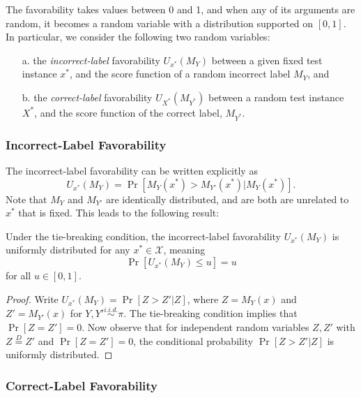 \documentclass[twoside,11pt]{article}
\begin{document}
The favorability takes values between 0 and 1, and when any of its
arguments are random, it becomes a random variable with a distribution
supported on $[0,1]$.  In particular, we consider the following two
random variables:
\begin{itemize}
\item[a.] the \emph{incorrect-label} favorability $U_{x^*}(M_Y)$
  between a given fixed test instance $x^*$, and the score function of
  a random incorrect label $M_{Y}$, and
\item[b.] the \emph{correct-label} favorability $U_{X^*}(M_{Y^*})$
  between a random test instance $X^*$, and the score function of the
  correct label, $M_{Y^*}$.
\end{itemize}
\subsubsection{Incorrect-Label Favorability}
The incorrect-label favorability can be written explicitly as
\begin{equation} %
U_{x^*}(M_Y) = \Pr[M_{Y}(x^*) > M_{Y'}(x^*)|M_{Y}(x^*)].
\end{equation}
Note that $M_Y$ and $M_{Y'}$ are identically distributed, and are both
are unrelated to $x^*$ that is fixed. This leads to the following
result:
\begin{lemma}\label{lemma:U_function}
Under the tie-breaking condition, the incorrect-label favorability
$U_{x^*}(M_Y)$ is uniformly distributed for any $x^* \in \mathcal{X}$,
meaning \begin{equation}\label{eq:Uniform} \Pr[U_{x^*}(M_Y) \leq u] = u
\end{equation}
for all $u \in [0,1].$
\end{lemma}


\begin{proof} Write $U_{x^*}(M_Y) = \Pr[Z > Z'|Z]$, where $Z = M_Y(x)$ and $Z' =
M_{Y'}(x)$ for $Y, Y' \stackrel{i.i.d.}{\sim} \pi$.
The tie-breaking condition implies that $\Pr[Z=Z']=0$.  Now observe that for independent random variables $Z, Z'$ with $Z \stackrel{D}{=} Z'$ and $\Pr[Z=Z']=0$, the conditional probability
$\Pr[Z > Z'|Z]$ is uniformly distributed.
\end{proof}


\subsubsection{Correct-Label Favorability}
\end{document}
